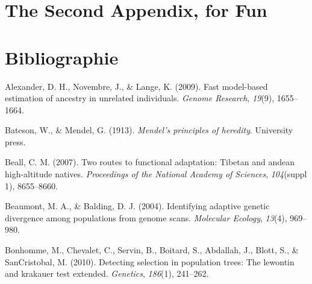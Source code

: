 \documentclass[12pt,a4paper,twoside]{ugathesis}
\theoremstyle{definition}
\theoremstyle{definition}
\theoremstyle{remark}
\begin{document}
\begin{Shaded}
\begin{Highlighting}[]
\StringTok{ }\NormalTok{(}\NormalTok{, }
                \NormalTok{, }
                \NormalTok{, }
                \NormalTok{, }
                \NormalTok{, }
                \NormalTok{, }
                \NormalTok{, }
                \NormalTok{)}
\end{Highlighting}
\end{Shaded}
\chapter{The Second Appendix, for
Fun}\label{the-second-appendix-for-fun}

\backmatter

\chapter*{Bibliographie}\label{bibliographie}

\noindent

\setlength{\parindent}{-0.20in} \setlength{\leftskip}{0.20in}
\setlength{\parskip}{8pt}

\hypertarget{refs}{}
\hypertarget{ref-alexander2009fast}{}
Alexander, D. H., Novembre, J., \& Lange, K. (2009). Fast model-based
estimation of ancestry in unrelated individuals. \emph{Genome Research},
\emph{19}(9), 1655--1664.

\hypertarget{ref-bateson1913mendel}{}
Bateson, W., \& Mendel, G. (1913). \emph{Mendel's principles of
heredity}. University press.

\hypertarget{ref-beall2007two}{}
Beall, C. M. (2007). Two routes to functional adaptation: Tibetan and
andean high-altitude natives. \emph{Proceedings of the National Academy
of Sciences}, \emph{104}(suppl 1), 8655--8660.

\hypertarget{ref-beaumont2004identifying}{}
Beaumont, M. A., \& Balding, D. J. (2004). Identifying adaptive genetic
divergence among populations from genome scans. \emph{Molecular
Ecology}, \emph{13}(4), 969--980.

\hypertarget{ref-bonhomme2010detecting}{}
Bonhomme, M., Chevalet, C., Servin, B., Boitard, S., Abdallah, J.,
Blott, S., \& SanCristobal, M. (2010). Detecting selection in population
trees: The lewontin and krakauer test extended. \emph{Genetics},
\emph{186}(1), 241--262.
\end{document}
